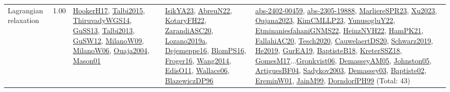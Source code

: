 {\begin{longtable}{p{3cm}r>{\raggedright\arraybackslash}p{6cm}>{\raggedright\arraybackslash}p{6cm}>{\raggedright\arraybackslash}p{8cm}}
\index{Lagrangian relaxation}\index{Algorithms!Lagrangian relaxation}Lagrangian relaxation &  1.00 & \hyperref[detail:HookerH17]{HookerH17}, \hyperref[detail:Talbi2015]{Talbi2015}, \hyperref[detail:ThiruvadyWGS14]{ThiruvadyWGS14}, \hyperref[detail:GuSS13]{GuSS13}, \hyperref[detail:Talbi2013]{Talbi2013}, \hyperref[detail:GuSW12]{GuSW12}, \hyperref[detail:MilanoW09]{MilanoW09}, \hyperref[detail:MilanoW06]{MilanoW06}, \hyperref[detail:Ouaja2004]{Ouaja2004}, \hyperref[detail:Mason01]{Mason01} & \hyperref[detail:IsikYA23]{IsikYA23}, \hyperref[detail:AbreuN22]{AbreuN22}, \hyperref[detail:KotaryFH22]{KotaryFH22}, \hyperref[detail:ZarandiASC20]{ZarandiASC20}, \hyperref[detail:Lozano2019a]{Lozano2019a}, \hyperref[detail:Dejemeppe16]{Dejemeppe16}, \hyperref[detail:BlomPS16]{BlomPS16}, \hyperref[detail:Froger16]{Froger16}, \hyperref[detail:Wang2014]{Wang2014}, \hyperref[detail:EdisO11]{EdisO11}, \hyperref[detail:Wallace06]{Wallace06}, \hyperref[detail:BlazewiczDP96]{BlazewiczDP96} & \hyperref[detail:abs-2402-00459]{abs-2402-00459}, \hyperref[detail:abs-2305-19888]{abs-2305-19888}, \hyperref[detail:MarliereSPR23]{MarliereSPR23}, \hyperref[detail:Xu2023]{Xu2023}, \hyperref[detail:Oujana2023]{Oujana2023}, \hyperref[detail:KimCMLLP23]{KimCMLLP23}, \hyperref[detail:YunusogluY22]{YunusogluY22}, \hyperref[detail:EtminaniesfahaniGNMS22]{EtminaniesfahaniGNMS22}, \hyperref[detail:HeinzNVH22]{HeinzNVH22}, \hyperref[detail:HamPK21]{HamPK21}, \hyperref[detail:FallahiAC20]{FallahiAC20}, \hyperref[detail:Tesch2020]{Tesch2020}, \hyperref[detail:CauwelaertDS20]{CauwelaertDS20}, \hyperref[detail:Schwarz2019]{Schwarz2019}, \hyperref[detail:He2019]{He2019}, \hyperref[detail:GurEA19]{GurEA19}, \hyperref[detail:BaptisteB18]{BaptisteB18}, \hyperref[detail:KreterSSZ18]{KreterSSZ18}, \hyperref[detail:GomesM17]{GomesM17}...\hyperref[detail:Gronkvist06]{Gronkvist06}, \hyperref[detail:DemasseyAM05]{DemasseyAM05}, \hyperref[detail:Johnston05]{Johnston05}, \hyperref[detail:ArtiguesBF04]{ArtiguesBF04}, \hyperref[detail:Sadykov2003]{Sadykov2003}, \hyperref[detail:Demassey03]{Demassey03}, \hyperref[detail:Baptiste02]{Baptiste02}, \hyperref[detail:EreminW01]{EreminW01}, \hyperref[detail:JainM99]{JainM99}, \hyperref[detail:DorndorfPH99]{DorndorfPH99} (Total: 43)\\

\end{longtable}}
